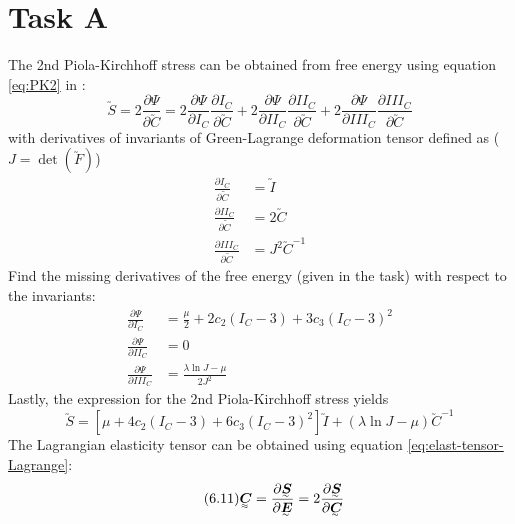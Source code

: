 \section{Task A}
\label{sec:task-a}

The 2nd Piola-Kirchhoff stress can be obtained from free energy using
equation \eqref{eq:PK2} in \cite{Bonet2008}:
\begin{equation} \tag{6.18}
  \label{eq:PK2}
  \utilde{S} = 2 \frac{\partial \Psi}{\partial \utilde{C}} =
  2 \frac{\partial \Psi}{\partial I_{C}} \frac{\partial I_{C}}{\partial \utilde{C}} +
  2 \frac{\partial \Psi}{\partial II_{C}} \frac{\partial II_{C}}{\partial \utilde{C}}+
  2 \frac{\partial \Psi}{\partial III_{C}} \frac{\partial III_{C}}{\partial \utilde{C}}
\end{equation}
with derivatives of invariants of Green-Lagrange deformation tensor defined as
(\(J = \det \left( \utilde{F} \right)\))
\begin{align}
  \frac{\partial I_{C}}{\partial \utilde{C}} &= \utilde{I} \tag{6.19a} \\
  \frac{\partial II_{C}}{\partial \utilde{C}} &= 2 \utilde{C} \tag{6.19b} \\
  \frac{\partial III_{C}}{\partial \utilde{C}} &= J^{2} \utilde{C}^{-1} \tag{6.22}
\end{align}
Find the missing derivatives of the free energy (given in the task) with respect
to the invariants:
\begin{align}
  \frac{\partial \Psi}{\partial I_{C}} &= 
  \frac{\mu}{2} + 2 c_{2}\left( I_{C} - 3 \right) + 3c_{3}\left( I_{C} - 3 \right)^{2}\\
  \frac{\partial \Psi}{\partial II_{C}} &= 0 \\
  \frac{\partial \Psi}{\partial III_{C}} &= \frac{\lambda \ln{J} - \mu}{2 J^{2}}
\end{align}
Lastly, the expression for the 2nd Piola-Kirchhoff stress yields
\begin{equation}
  \label{eq:PK2yeoh}
  \utilde{S} = \left[ \mu + 4c_{2}\left( I_{C} - 3 \right) +
    6c_{3}\left( I_{C} - 3 \right)^{2}\right] \utilde{I} + 
  \left( \lambda \ln{J} - \mu \right) \utilde{C}^{-1}
\end{equation}
The Lagrangian elasticity tensor can be obtained using equation 
\eqref{eq:elast-tensor-Lagrange}:
\begin{equation} \tag{6.11}
  \label{eq:elast-tensor-Lagrange}
  \uutilde{C} = \frac{\partial \utilde{S}}{\partial \utilde{E}} = 
  2 \frac{\partial \utilde{S}}{\partial \utilde{C}}
\end{equation}
